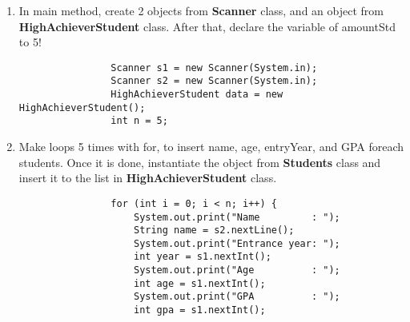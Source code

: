 \documentclass[12pt,titlepage]{article}
\begin{document}
\begin{enumerate}
\begin{enumerate}[label=\textbf{\alph*.}]
\begin{enumerate}[label=\arabic*.]
\begin{verbatim}
                    }
                }
            \end{verbatim}
            \item In main method, create 2 objects from \textbf{Scanner} class, and an object from \textbf{HighAchieverStudent} class. After that, declare the variable of amountStd to 5!
            \begin{verbatim}
                Scanner s1 = new Scanner(System.in);
                Scanner s2 = new Scanner(System.in);
                HighAchieverStudent data = new HighAchieverStudent();
                int n = 5;
            \end{verbatim}
            \item Make loops 5 times with for, to insert name, age, entryYear, and GPA foreach students. Once it is done, instantiate the object from \textbf{Students} class and insert it to the list in \textbf{HighAchieverStudent} class.
            \begin{verbatim}
                for (int i = 0; i < n; i++) {
                    System.out.print("Name         : ");
                    String name = s2.nextLine();
                    System.out.print("Entrance year: ");
                    int year = s1.nextInt();
                    System.out.print("Age          : ");
                    int age = s1.nextInt();
                    System.out.print("GPA          : ");
                    int gpa = s1.nextInt();


\end{verbatim}
\end{enumerate}
\end{enumerate}
\end{enumerate}
\end{document}

